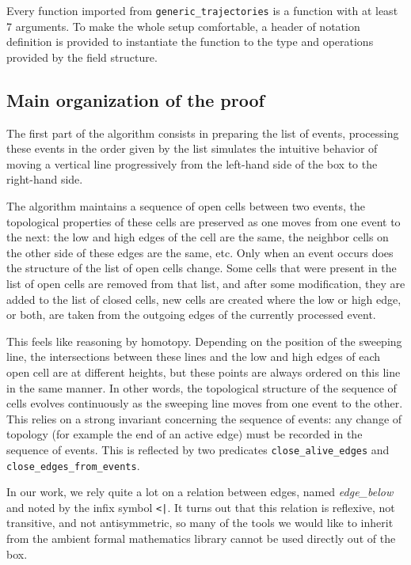 \documentclass[a4paper, USenglish, cleveref, autoref, thm-restate]{lipics-v2021}
\begin{document}
Every function imported from {\tt generic\_trajectories} is a function
with at least 7 arguments.  To make the whole setup comfortable, a
header of notation definition is provided to instantiate the function
to the type and operations provided by the field structure.


\subsection{Main organization of the proof}
The first part of the algorithm consists in preparing the list of
events, processing these events in the order given by the list
simulates the intuitive behavior of moving a vertical line
progressively from the left-hand side of the box to the right-hand
side.

The algorithm maintains a sequence of open cells between two events,
the topological properties of these cells are preserved as one moves
from one event to the next: the low and high edges of the cell are the
same, the neighbor cells on the other side of these edges are the
same, etc.  Only when an event occurs does the structure of the list
of open cells change.  Some cells that were present in the list of
open cells are removed from that list, and after some modification,
they are added to the list of closed cells, new cells are created
where the low or high edge, or both, are taken from the outgoing edges
of the currently processed event.

This feels like reasoning by homotopy.  Depending on the position of
the sweeping line, the intersections between these lines and the low
and high edges of each open cell are at different heights, but these
points are always ordered on this line in the same manner.  In other
words, the topological structure of the sequence of cells evolves
continuously as the sweeping line moves from one event to the other.
This relies on a strong invariant concerning the sequence of events:
any change of topology (for example the end of an active edge) must be
recorded in the sequence of events.  This is reflected by two
predicates {\tt close\_alive\_edges} and {\tt close\_edges\_from\_events}.

In our work, we rely quite a lot on a relation between edges, named
{\em edge\_below} and noted by the infix symbol {\tt <|}.  It turns
out that this relation is reflexive, not transitive, and not
antisymmetric, so many of the tools we
would like to inherit from the ambient formal mathematics library
cannot be used directly out of the box.
\end{document}

